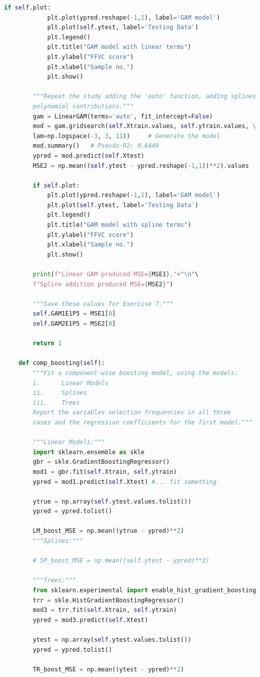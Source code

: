 \documentclass[]{article}
\begin{document}
\begin{lstlisting}[language=Python]
		if self.plot:
			plt.plot(ypred.reshape(-1,1), label='GAM model')
			plt.plot(self.ytest, label='Testing Data')
			plt.legend()
			plt.title("GAM model with linear terms")
			plt.ylabel("FFVC score")
			plt.xlabel("Sample no.")
			plt.show()
		
		"""Repeat the study adding the 'auto' function, adding splines and
		polynomial contributions."""
		gam = LinearGAM(terms='auto', fit_intercept=False)
		mod = gam.gridsearch(self.Xtrain.values, self.ytrain.values, \
		lam=np.logspace(-3, 3, 11))     # Generate the model
		mod.summary()   # Pseudo-R2: 0.6449
		ypred = mod.predict(self.Xtest)
		MSE2 = np.mean((self.ytest - ypred.reshape(-1,1))**2).values
		
		if self.plot:
			plt.plot(ypred.reshape(-1,1), label='GAM model')
			plt.plot(self.ytest, label='Testing Data')
			plt.legend()
			plt.title("GAM model with spline terms")
			plt.ylabel("FFVC score")
			plt.xlabel("Sample no.")
			plt.show()
		
		print(f"Linear GAM produced MSE={MSE1},"+"\n"\
		f"Spline addition produced MSE={MSE2}")
		
		"""Save these values for Exercise 7."""
		self.GAM1E1P5 = MSE1[0]
		self.GAM2E1P5 = MSE2[0]
		
		return 1
	
	def comp_boosting(self):
		"""Fit a component-wise boosting model, using the models:
		i.      Linear Models
		ii.     Splines
		iii.    Trees
		Report the variables selection frequencies in all three
		cases and the regression coefficients for the first model."""
		
		"""Linear Models:"""
		import sklearn.ensemble as skle
		gbr = skle.GradientBoostingRegressor()
		mod1 = gbr.fit(self.Xtrain, self.ytrain)
		ypred = mod1.predict(self.Xtest) #... fit something.
		
		ytrue = np.array(self.ytest.values.tolist())
		ypred = ypred.tolist()
		
		LM_boost_MSE = np.mean((ytrue - ypred)**2)
		"""Splines:"""
		
		# SP_boost_MSE = np.mean((self.ytest - ypred)**2)
		
		"""Trees:"""
		from sklearn.experimental import enable_hist_gradient_boosting
		trr = skle.HistGradientBoostingRegressor()
		mod3 = trr.fit(self.Xtrain, self.ytrain)
		ypred = mod3.predict(self.Xtest)
		
		ytest = np.array(self.ytest.values.tolist())
		ypred = ypred.tolist()
		
		TR_boost_MSE = np.mean((ytest - ypred)**2)
		

\end{lstlisting}
\end{document}
